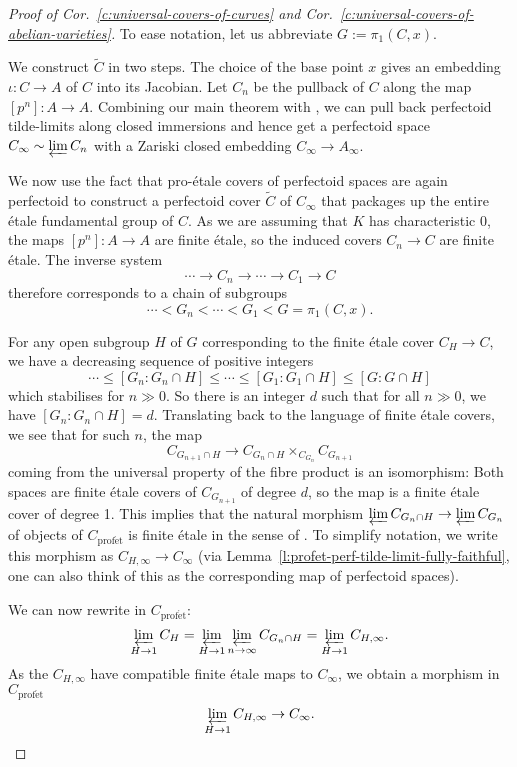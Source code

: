 \documentclass[10pt,oneside]{amsart}
\theoremstyle{definition}
\newcommand{\profet}{\operatorname{prof\acute{e}t}}
\begin{document}
\begin{proof}[Proof of Cor.~\ref{c:universal-covers-of-curves} and Cor.~\ref{c:universal-covers-of-abelian-varieties}]
To ease notation, let us abbreviate $G:=\pi_1(C,x)$.
	
We construct $\tilde{C}$ in two steps. 
The choice of the base point $x$ gives an embedding $\iota\colon C\rightarrow A$ of $C$ into its Jacobian. Let $C_n$ be the pullback of $C$ along the map $[p^n]\colon A\rightarrow A$. Combining our main theorem with \cite[Lemma II.2.2]{torsion}, we can pull back perfectoid tilde-limits along closed immersions and hence get a perfectoid space $C_\infty\sim \varprojlim C_n$ with a Zariski closed embedding $C_\infty\rightarrow A_\infty$.

We now use the fact that pro-\'etale covers of perfectoid spaces are again perfectoid to construct a perfectoid cover $\tilde{C}$ of $C_\infty$ that packages up the entire \'etale fundamental group of $C$. As we are assuming that $K$ has characteristic 0, the maps $[p^n]\colon A\rightarrow A$ are finite \'etale, so the induced covers $C_n\rightarrow C$ are finite \'etale. The inverse system 
\[\cdots \rightarrow C_n \rightarrow \cdots \rightarrow C_1\rightarrow C\] 
therefore corresponds to a chain of subgroups
\[\cdots < G_n <\cdots < G_1 < G=\pi_1(C,x).\]

For any open subgroup $H$ of $G$ corresponding to the finite \'etale cover $C_H\rightarrow C$, we have a decreasing sequence of positive integers 
\[\cdots \leq [G_n:G_n\cap H] \leq \cdots \leq [G_1:G_1\cap H]\leq [G:G\cap H]\]
which stabilises for $n\gg 0$.
So there is an integer $d$ such that for all $n\gg0 $, we have $[G_n:G_n\cap H]=d$. Translating back to the language of finite \'etale covers, we see that for such $n$, the map
\[C_{G_{n+1}\cap H}\rightarrow C_{G_n\cap H}\times_{C_{G_n}} C_{G_{n+1}}\]
coming from the universal property of the fibre product is an isomorphism: Both spaces are finite \'etale covers of $C_{G_{n+1}}$ of degree $d$, so the map is a finite \'etale cover of degree 1. This implies that the natural morphism $\varprojlim C_{G_n \cap H}\rightarrow \varprojlim C_{G_n}$ of objects of $C_{\profet}$ is finite \'etale in the sense of \cite[Definition 3.9]{p-adic_Hodge}. To simplify notation, we write this morphism as $C_{H,\infty}\rightarrow C_\infty$ (via Lemma~\ref{l:profet-perf-tilde-limit-fully-faithful}, one can also think of this as the corresponding map of perfectoid spaces).

We can now rewrite in $C_{\profet}$:
\[\displaystyle\varprojlim_{H\rightarrow 1} C_H=\varprojlim_{H\rightarrow 1}\displaystyle\varprojlim_{n\rightarrow \infty} C_{G_n\cap H}=\varprojlim_{H\rightarrow 1}C_{H,\infty}.\]
As the $C_{H,\infty}$ have compatible finite \'etale maps to $C_\infty$, we obtain a morphism in $C_{\profet}$
\[\varprojlim_{H\rightarrow 1}C_{H,\infty}\rightarrow C_\infty.\]


\end{proof}
\end{document}

